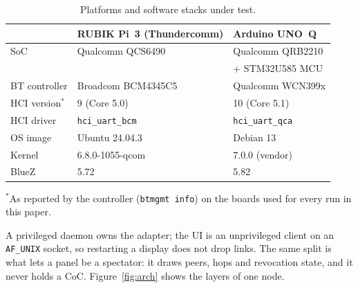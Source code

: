 \documentclass[conference,10pt]{IEEEtran}
\begin{document}
\begin{table}[t]
\centering
\caption{Platforms and software stacks under test.}
\label{tab:platforms}
\begin{tabular}{@{}lll@{}}
\toprule
 & RUBIK Pi~3 (Thundercomm) & Arduino UNO~Q \\
\midrule
SoC & Qualcomm QCS6490 & Qualcomm QRB2210 \\
 & & + STM32U585 MCU \\
BT controller & Broadcom BCM4345C5 & Qualcomm WCN399x \\
HCI version$^{*}$ & 9 (Core 5.0) & 10 (Core 5.1) \\
HCI driver & \texttt{hci\_uart\_bcm} & \texttt{hci\_uart\_qca} \\
OS image & Ubuntu 24.04.3 & Debian 13 \\
Kernel & 6.8.0-1055-qcom & 7.0.0 (vendor) \\
BlueZ & 5.72 & 5.82 \\
\bottomrule
\end{tabular}

\smallskip
{\footnotesize $^{*}$As reported by the controller (\texttt{btmgmt info}) on
the boards used for every run in this paper.\par}
\end{table} A privileged daemon owns the adapter; the UI is an
unprivileged client on an \texttt{AF\_UNIX} socket, so restarting a
display does not drop links. The same split is what lets a panel be a
spectator: it draws peers, hops and revocation state, and it never holds
a CoC. Figure~\ref{fig:arch} shows the layers of one node.
\end{document}
